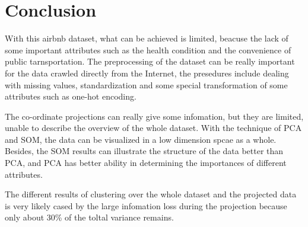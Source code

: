 \documentclass[12pt]{article}
\begin{document}
\section{Conclusion}
With this airbnb dataset, what can be achieved is limited, beacuse the lack of some important attributes such as the health condition and the convenience of public tarnsportation. The preprocessing of the dataset can be really important for the data crawled directly from the Internet, the presedures include dealing with missing values, standardization and some special transformation of some attributes such as one-hot encoding. \par 
The co-ordinate projections can really give some infomation, but they are limited, unable to describe the overview of the whole dataset. With the technique of PCA and SOM, the data can be visualized in a low dimension spcae as a whole. Besides, the SOM results can illustrate the structure of the data better than PCA, and PCA has better ability in determining the importances of different attributes.
\par The different results of clustering over the whole dataset and the projected data is very likely cased by the large infomation loss during the projection because only about 30\% of the toltal variance remains.
\newpage

\end{document}
